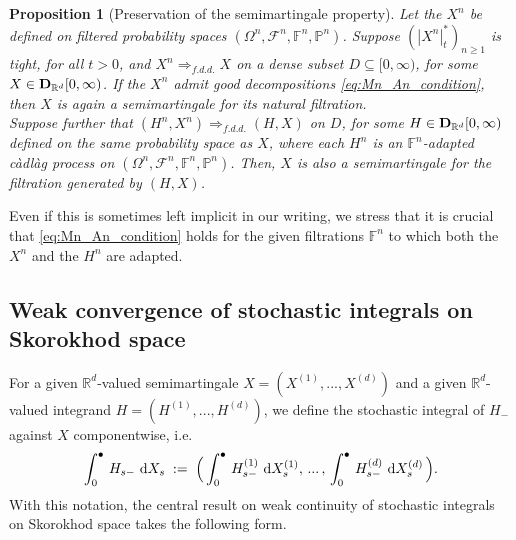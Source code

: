 \documentclass[11pt]{article}
\newtheorem{prop}[theorem]{Proposition}
\theoremstyle{definition}\newtheorem{example}[theorem]{Example}
\theoremstyle{definition}\newtheorem{counterexample}[theorem]{Counterexample}
\theoremstyle{definition}\newtheorem{remark}[theorem]{Remark}
\theoremstyle{definition}\newtheorem{defi}[theorem]{Definition}
\numberwithin{equation}{section}
\newcommand{\R}{\mathbb{R}}
\newcommand{\D}{{\bf D}}											%
\newcommand{\F}{\mathbb{F}}											%
\newcommand*\diff{\mathop{}\!\mathrm{d}}								%
\newcommand{\Pro}{\mathbb{P}}										%
\renewcommand{\|}{\; : \, \;}											%
\begin{document}
\begin{prop}[Preservation of the semimartingale property]\label{prop:preserve_semimartin} Let the $X^n$ be defined on filtered probability spaces $(\Omega^n, \mathcal{F}^n, \F^n, \Pro^n)$. Suppose $(|X^n|^*_t)_{n\ge 1}$ is tight, for all $t>0$, and $X^n \Rightarrow_{f.d.d.} X$ on a dense subset $D\subseteq [0,\infty)$, for some $X \in \D_{\R^d}[0,\infty) $. If the $X^n$ admit good decompositions \eqref{eq:Mn_An_condition}, then $X$ is again a semimartingale for its natural filtration. \\  Suppose further that $(H^n,X^n) \Rightarrow_{f.d.d.} (H,X)$ on $D$, for some $H \in \D_{\R^d}[0,\infty)$ defined on the same probability space as $X$, where each $H^n$ is an $\F^n$-adapted c\`adl\`ag process on $(\Omega^n, \mathcal{F}^n, \F^n, \Pro^n)$. Then, $X$ is also a semimartingale for the filtration generated by $(H,X)$.
\end{prop}


Even if this is sometimes left implicit in our writing, we stress that it is crucial that \eqref{eq:Mn_An_condition} holds for the given filtrations $\F^n$ to which both the $X^n$ and the $H^n$ are adapted.


\subsection{Weak convergence of stochastic integrals on Skorokhod space}\label{subsect:main_results}

For a given $\R^d$-valued semimartingale $X=(X^{(1)},...,X^{(d)})$ and a given $\R^d$-valued integrand $H=(H^{(1)},...,H^{(d)})$, we define the stochastic integral of $H_-$ against $X$ componentwise, i.e.
\[
\int_0^\bullet \, H_{s-} \, \diff X_s \; := \; \Bigl( \, \int_0^\bullet \, H^{(1)}_{s-} \, \diff X_s^{(1)}, \, ... \,, \, \int_0^\bullet \, H^{(d)}_{s-} \, \diff X_s^{(d)} \, \Bigr).
\]
With this notation, the central result on weak continuity of stochastic integrals on Skorokhod space takes the following form.
\end{document}
